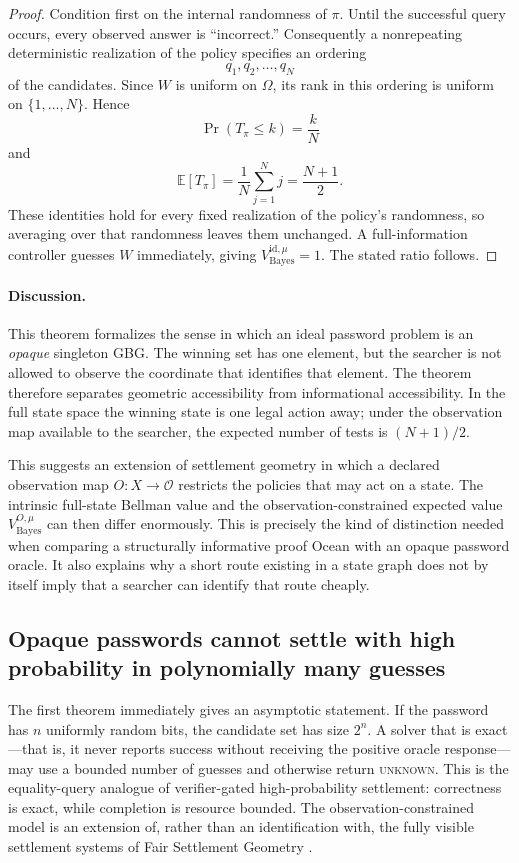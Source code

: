 \documentclass[11pt]{article}
\begin{document}
\begin{proof}
Condition first on the internal randomness of $\pi$.  Until the successful
query occurs, every observed answer is ``incorrect.''  Consequently a
nonrepeating deterministic realization of the policy specifies an ordering
\[
    q_1,q_2,\ldots,q_N
\]
of the candidates.  Since $W$ is uniform on $\Omega$, its rank in this ordering
is uniform on $\{1,\ldots,N\}$.  Hence
\[
    \Pr(T_\pi\leq k)=\frac{k}{N}
\]
and
\[
    \mathbb{E}[T_\pi]
    =\frac{1}{N}\sum_{j=1}^N j
    =\frac{N+1}{2}.
\]
These identities hold for every fixed realization of the policy's randomness,
so averaging over that randomness leaves them unchanged.  A full-information controller guesses $W$ immediately, giving
$V^{\mathrm{id},\mu}_{\mathrm{Bayes}}=1$.  The stated ratio follows.
\end{proof}

\paragraph{Discussion.}
This theorem formalizes the sense in which an ideal password problem is an
\emph{opaque} singleton GBG.  The winning set has one element, but the
searcher is not allowed to observe the coordinate that identifies that element.
The theorem therefore separates geometric accessibility from informational
accessibility.  In the full state space the winning state is one legal action
away; under the observation map available to the searcher, the expected number
of tests is $(N+1)/2$.

This suggests an extension of settlement geometry in which a declared
observation map $O:X\to\mathcal O$ restricts the policies that may act on a
state.  The intrinsic full-state Bellman value and the observation-constrained expected value
$V^{O,\mu}_{\mathrm{Bayes}}$ can then differ enormously.  This is precisely the kind of distinction
needed when comparing a structurally informative proof Ocean with an opaque
password oracle.  It also explains why a short route existing in a state graph
does not by itself imply that a searcher can identify that route cheaply.

\subsection{Opaque passwords cannot settle with high probability in polynomially many guesses}

The first theorem immediately gives an asymptotic statement.  If the password
has $n$ uniformly random bits, the candidate set has size $2^n$.  A solver that
is exact---that is, it never reports success without receiving the positive
oracle response---may use a bounded number of guesses and otherwise return
\textsc{unknown}.  This is the equality-query analogue of verifier-gated high-probability
settlement: correctness is exact, while completion is resource bounded.  The
observation-constrained model is an extension of, rather than an identification
with, the fully visible settlement systems of Fair Settlement Geometry
\cite{tenneson-fair}.
\end{document}
